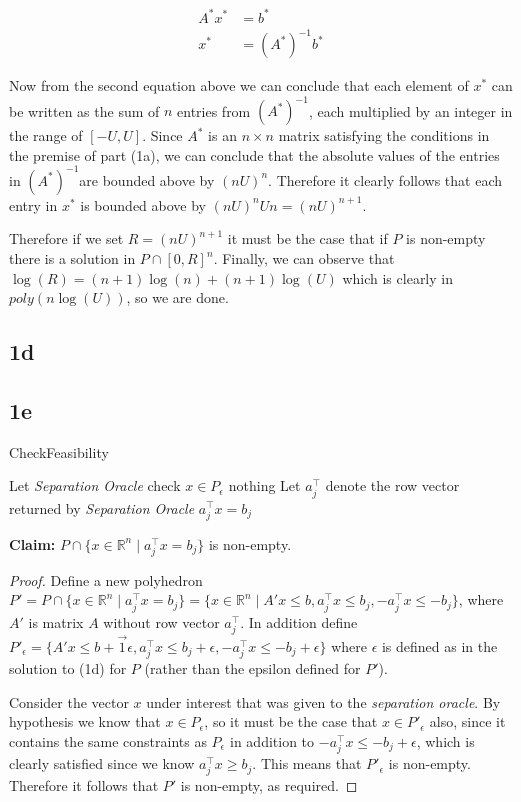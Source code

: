 \documentclass{article}
\newcommand{\astarinv}{$(A^*)^{-1}$}
\begin{document}
\begin{align}
  A^* x^* &= b^* \\
  x^* &= (A^*)^{-1} b^* 
\end{align}

Now from the second equation above we can conclude that each element
of $x^*$ can be written as the sum of $n$ entries from \astarinv,
each multiplied by an integer in the range of $[-U, U]$. Since $A^*$
is an $n \times n$ matrix satisfying the conditions in the premise
of part (1a), we can conclude that the absolute values of the
entries in \astarinv are bounded above by $(nU)^n$. Therefore it
clearly follows that each entry in $x^*$ is bounded above by
$(nU)^n U n = (nU)^{n + 1}$.

Therefore if we set
$R = (nU)^{n + 1}$ it must be the case that if $P$ is
non-empty there is a solution in $P \cap [0, R]^n$.
Finally, we can observe that $\log(R) = (n + 1)\log(n) + (n + 1)\log(U)$
which is clearly in $poly(n\log(U))$, so we are done.


\subsection*{1d}
\subsection*{1e}\begin{algorithm}[H]
\caption{{\sc CheckFeasibility}}
\begin{algorithmic}[1]
\State Let {\em Separation Oracle} check $x\in P_{\epsilon}$
\Return nothing
\Else
\State Let $a_j^{\intercal}$ denote the row vector returned by {\em Separation Oracle}
\State \Return $a_j^{\intercal}x = b_j$
\EndIf
\end{algorithmic}
\end{algorithm}
\textbf{Claim:} $P\cap \{x\in\mathbb{R}^n\mid a_j^{\intercal}x = b_j\}$ is non-empty.
\begin{proof}
  Define a new polyhedron $P' = P\cap \{x\in\mathbb{R}^n\mid a_j^{\intercal}x = b_j\} =
  \{x\in\mathbb{R}^n\mid A'x \leq b, a_j^{\intercal}x \leq b_j, -a_j^{\intercal}x \leq -b_j \}$,
  where $A'$ is matrix $A$ without row vector $a_j^{\intercal}$.
  In addition define $P'_{\epsilon} = \{A'x\leq b + \vec{1}\epsilon, a_j^{\intercal}x \leq b_j
  + \epsilon, -a_j^{\intercal}x \leq -b_j + \epsilon\}$ where $\epsilon$ is defined as in the
  solution to (1d) for $P$ (rather than the epsilon defined for $P'$).

  Consider the vector $x$ under interest that was given to the {\em separation oracle}.
  By hypothesis we know that $x \in P_\epsilon$, so it must be the case that $x \in P'_\epsilon$
  also, since it contains the same constraints as $P_\epsilon$ in addition to
  $-a_j^{\intercal}x \leq -b_j + \epsilon$,
  which is clearly satisfied since we know $a_j^{\intercal}x \geq b_j$. This means that
  $P'_\epsilon$ is non-empty. Therefore it follows that $P'$ is non-empty, as required.
\end{proof}
\end{document}
